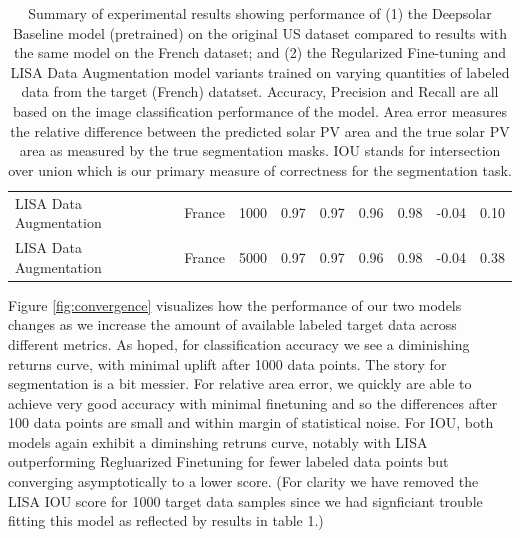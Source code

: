 \documentclass[10pt,twocolumn,letterpaper]{article}
\begin{document}
\begin{table}[htp]
\begin{tabular}{lcccccccc}
LISA Data Augmentation &  France  & 1000 &  0.97 & 0.97 & 0.96 & 0.98 & -0.04 & 0.10 \\
LISA Data Augmentation &  France  & 5000 &  0.97 & 0.97 & 0.96 & 0.98 & -0.04 & 0.38 \\
\hline
\end{tabular}
\begin{center}
    \caption{Summary of experimental results showing performance of (1) the Deepsolar Baseline model (pretrained) on the original US dataset compared to results with the same model on the French dataset; and (2) the Regularized Fine-tuning and LISA Data Augmentation model variants trained on varying quantities of labeled data from the target (French) datatset. 
    Accuracy, Precision and Recall are all based on the image classification performance of the model. Area error measures the relative difference between the predicted solar PV area and the true solar PV area as measured by the true segmentation masks. IOU stands for intersection over union which is our primary measure of correctness for the segmentation task.}
\end{center}
\label{table:results}
\end{table}

Figure \ref{fig:convergence} visualizes how the performance of our two models changes as we increase the amount of available labeled target data across different metrics. As hoped, for classification accuracy we see a diminishing returns curve, with minimal uplift after 1000 data points. The story for segmentation is a bit messier. For relative area error, we quickly are able to achieve very good accuracy with minimal finetuning and so the differences after 100 data points are small and within margin of statistical noise. For IOU, both models again exhibit a diminshing retruns curve, notably with LISA outperforming Regluarized Finetuning for fewer labeled data points but converging asymptotically to a lower score. (For clarity we have removed the LISA IOU score for 1000 target data samples since we had signficiant trouble fitting this model as reflected by results in table 1.) 
\end{document}
